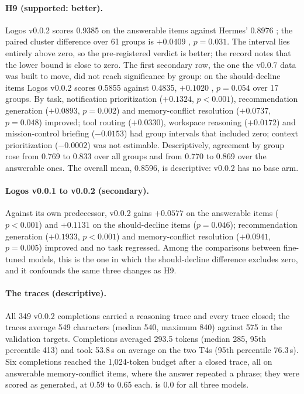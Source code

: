 \paragraph{H9 (supported: better).} Logos v0.0.2 scores 0.9385  on the answerable items against Hermes' 0.8976 ; the paired cluster difference over 61 groups is $+0.0409$ , $p = 0.031$. The interval lies entirely above zero, so the pre-registered verdict is better; the record notes that the lower bound is close to zero. The first secondary row, the one the v0.0.7 data was built to move, did not reach significance by group: on the should-decline items Logos v0.0.2 scores 0.5855 against 0.4835, $+0.1020$ , $p = 0.054$ over 17 groups. By task, notification prioritization ($+0.1324$, $p<0.001$), recommendation generation ($+0.0893$, $p = 0.002$) and memory-conflict resolution ($+0.0737$, $p = 0.048$) improved; tool routing ($+0.0330$), workspace reasoning ($+0.0172$) and mission-control briefing ($-0.0153$) had group intervals that included zero; context prioritization ($-0.0002$) was not estimable. Descriptively, agreement by group rose from 0.769 to 0.833 over all groups and from 0.770 to 0.869 over the answerable ones. The overall mean, 0.8596, is descriptive: v0.0.2 has no base arm.

\paragraph{Logos v0.0.1 to v0.0.2 (secondary).} Against its own predecessor, v0.0.2 gains $+0.0577$  on the answerable items ($p<0.001$) and $+0.1131$  on the should-decline items ($p = 0.046$); recommendation generation ($+0.1933$, $p<0.001$) and memory-conflict resolution ($+0.0941$, $p = 0.005$) improved and no task regressed. Among the comparisons between fine-tuned models, this is the one in which the should-decline difference excludes zero, and it confounds the same three changes as H9.

\paragraph{The traces (descriptive).} All 349 v0.0.2 completions carried a reasoning trace and every trace closed; the traces average 549 characters (median 540, maximum 840) against 575 in the validation targets. Completions averaged 293.5 tokens (median 285, 95th percentile 413) and took 53.8\,s on average on the two T4s (95th percentile 76.3\,s). Six completions reached the 1,024-token budget after a closed trace, all on answerable memory-conflict items, where the answer repeated a phrase; they were scored as generated, at 0.59 to 0.65 each.  is 0.0 for all three models.

